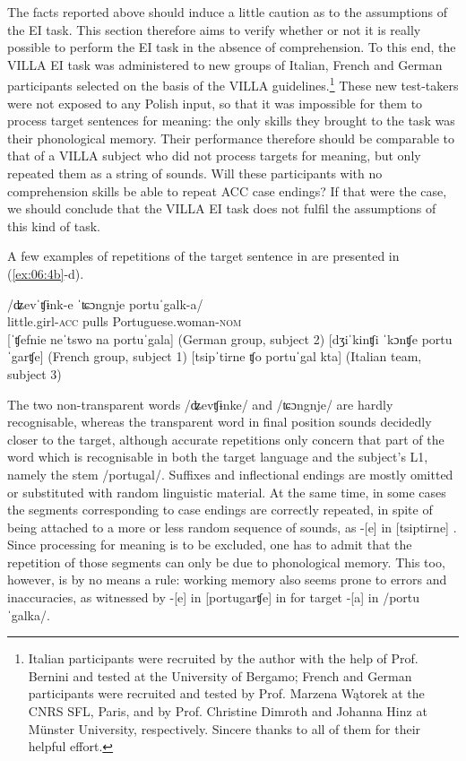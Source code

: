 The facts reported above should induce a little caution as to the assumptions of the EI task. This section therefore aims to verify whether or not it is really possible to perform the EI task in the absence of comprehension. To this end, the VILLA EI task was administered to new groups of Italian, French and German participants selected on the basis of the VILLA guidelines.\footnote{Italian participants were recruited by the author with the help of Prof. Bernini and tested at the University of Bergamo; French and German participants were recruited and tested by Prof. Marzena Wątorek at the CNRS SFL, Paris, and by Prof. Christine Dimroth and Johanna Hinz at Münster University, respectively. Sincere thanks to all of them for their helpful effort.} These new test-takers were not exposed to any Polish input, so that it was impossible for them to process target sentences for meaning: the only skills they brought to the task was their phonological memory. Their performance therefore should be comparable to that of a VILLA subject who did not process targets for meaning, but only repeated them as a string of sounds. Will these participants with no comprehension skills be able to repeat ACC case endings? If that were the case, we should conclude that the VILLA EI task does not fulfil the assumptions of this kind of task.

A few examples of repetitions of the target sentence in  are presented in (\ref{ex:06:4b}-d).

\ea%
    \label{ex:06:4}
    \ea\label{ex:06:4a}
    \gll    /ʥevˈʧɨnk-e  ˈʨɔngnje  portuˈgalk-a/ \\
            little.girl-\textsc{acc}   pulls     Portuguese.woman-\textsc{nom}\\
    \ex\label{ex:06:4b}
    [ˈʧefnie neˈtswo na portuˈgala] \hfill (German group, subject 2)
    \ex\label{ex:06:4c}
    [dʒiˈkinʧi ˈkɔnʧe portuˈgarʧe] \hfill (French group, subject 1)
    \ex\label{ex:06:4d}
    [tsipˈtirne ʧo portuˈgal kta] \hfill (Italian team, subject 3)
    \z
\z

The two non-transparent words /ʥevʧɨnke/ and /ʨɔngnje/ are hardly recognisable, whereas the transparent word in final position sounds decidedly closer to the target, although accurate repetitions only concern that part of the word which is recognisable in both the target language and the subject's L1, namely the stem /portugal/. Suffixes and inflectional endings are mostly omitted or substituted with random linguistic material. At the same time, in some cases the segments corresponding to case endings are correctly repeated, in spite of being attached to a more or less random sequence of sounds, as -[e] in [tsiptirne] . Since processing for meaning is to be excluded, one has to admit that the repetition of those segments can only be due to phonological memory. This too, however, is by no means a rule: working memory also seems prone to errors and inaccuracies, as witnessed by -[e] in [portugarʧe] in  for target -[a] in /portuˈgalka/.

